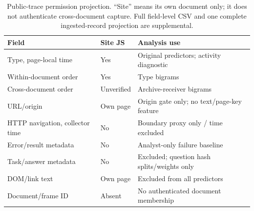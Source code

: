 \begin{table}[t]
\centering\footnotesize
\caption{Public-trace permission projection. ``Site'' means its own document only; it does not authenticate cross-document capture. Full field-level CSV and one complete ingested-record projection are supplemental.}
\label{tab:h2-field-permissions}
\begin{tabularx}{\columnwidth}{@{}p{}p{}Y@{}}
\toprule
Field & Site JS & Analysis use \\
\midrule
Type, page-local time & Yes & Original predictors; activity diagnostic \\
Within-document order & Yes & Type bigrams \\
Cross-document order & Unverified & Archive-receiver bigrams \\
URL/origin & Own page & Origin gate only; no text/page-key feature \\
HTTP navigation, collector time & No & Boundary proxy only / time excluded \\
Error/result metadata & No & Analyst-only failure baseline \\
Task/answer metadata & No & Excluded; question hash splits/weights only \\
DOM/link text & Own page & Excluded from all predictors \\
Document/frame ID & Absent & No authenticated document membership \\
\bottomrule
\end{tabularx}
\end{table}
